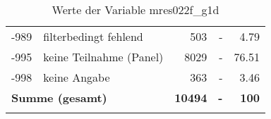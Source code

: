 \begin{longtable}{Xlrrr}
       -989 & filterbedingt fehlend & \num{503} & - & \num[round-mode=places,round-precision=2]{4.79} \\

       -995 & keine Teilnahme (Panel) & \num{8029} & - & \num[round-mode=places,round-precision=2]{76.51} \\

       -998 & keine Angabe & \num{363} & - & \num[round-mode=places,round-precision=2]{3.46} \\

     \midrule
     \multicolumn{2}{l}{\textbf{Summe (gesamt)}} & \textbf{\num{10494}} & \textbf{-} & \textbf{\num{100}} \\
     \bottomrule
     \caption{Werte der Variable mres022f\_g1d}
     \end{longtable}
     
